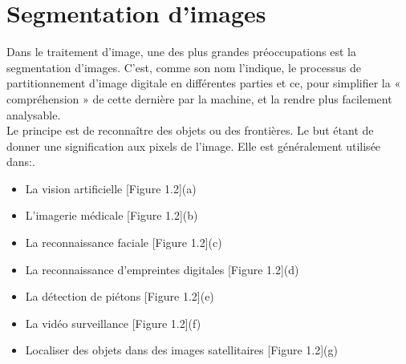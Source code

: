 

\section{Segmentation d’images}

\indent Dans le traitement d’image, une des plus grandes préoccupations est la segmentation d’images. C’est, comme son nom l’indique, le processus de partitionnement d’image digitale en différentes parties et ce, pour simplifier la « compréhension »  de cette dernière par la machine, et la rendre plus facilement analysable.\\

Le principe est de reconnaître des objets ou des frontières. Le but étant de donner une signification aux pixels de l’image. Elle est généralement utilisée dans:.\\

\begin{itemize}
\item La vision artificielle [Figure 1.2](a)\\
\item \indent L’imagerie médicale [Figure 1.2](b)\\
\item \indent La reconnaissance faciale [Figure 1.2](c)\\
\item \indent La reconnaissance d'empreintes digitales [Figure 1.2](d)\\
\item \indent La détection de piétons [Figure 1.2](e)\\
\item \indent La vidéo surveillance [Figure 1.2](f)\\
\item \indent Localiser des objets dans des images satellitaires [Figure 1.2](g)\\
\end{itemize}


